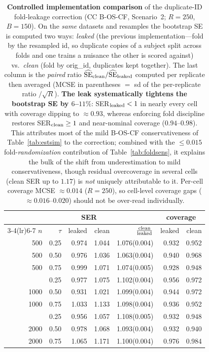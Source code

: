 \begin{table}[t]\centering\small
\caption{\textbf{Controlled implementation comparison} of the duplicate-ID fold-leakage correction (CC B-OS-CF, Scenario~2; $R=250$, $B=150$). On the \emph{same} datasets and resamples the bootstrap SE is computed two ways: \emph{leaked} (the previous implementation---fold by the resampled id, so duplicate copies of a subject split across folds and one trains a nuisance the other is scored against) vs.\ \emph{clean} (fold by orig\_id, duplicates kept together). The last column is the \emph{paired} ratio $\widehat{\mathrm{SE}}_{\rm clean}/\widehat{\mathrm{SE}}_{\rm leaked}$ computed per replicate then averaged (MCSE in parentheses $=$ sd of the per-replicate ratio $/\sqrt R$). \textbf{The leak systematically tightens the bootstrap SE by $6$--$11\%$}: SER$_{\rm leaked}<1$ in nearly every cell with coverage dipping to $\approx0.93$, whereas enforcing fold discipline restores SER$_{\rm clean}\ge1$ and near-nominal coverage ($0.94$--$0.98$). This attributes most of the mild B-OS-CF conservativeness of Table~\ref{tab:estsim} to the correction; combined with the $\le0.015$ fold-\emph{randomization} contribution of Table~\ref{tab:foldsens}, it explains the bulk of the shift from underestimation to mild conservativeness, though residual overcoverage in several cells (clean SER up to $1.17$) is \emph{not} uniquely attributable to it. Per-cell coverage MCSE $\approx0.014$ ($R{=}250$), so cell-level coverage gaps ($\approx0.016$--$0.020$) should not be over-read individually.}
\label{tab:leakfold}\begin{tabular}{rr rr r rr}\toprule
&&\multicolumn{2}{c}{SER}&&\multicolumn{2}{c}{coverage}\\
\cmidrule(lr){3-4}\cmidrule(lr){6-7}
$n$&$\tau$&leaked&clean&$\tfrac{\rm clean}{\rm leaked}$&leaked&clean\\\midrule
500 & 0.25 & 0.974 & 1.044 & 1.076(0.004) & 0.932 & 0.952 \\
500 & 0.50 & 0.976 & 1.036 & 1.063(0.004) & 0.940 & 0.968 \\
500 & 0.75 & 0.999 & 1.071 & 1.074(0.005) & 0.928 & 0.948 \\
\addlinespace
1000 & 0.25 & 0.977 & 1.075 & 1.102(0.004) & 0.956 & 0.972 \\
1000 & 0.50 & 0.931 & 1.021 & 1.099(0.004) & 0.944 & 0.972 \\
1000 & 0.75 & 1.033 & 1.133 & 1.098(0.004) & 0.936 & 0.952 \\
\addlinespace
2000 & 0.25 & 0.956 & 1.057 & 1.108(0.005) & 0.932 & 0.948 \\
2000 & 0.50 & 0.978 & 1.068 & 1.093(0.004) & 0.932 & 0.940 \\
2000 & 0.75 & 1.065 & 1.171 & 1.100(0.004) & 0.976 & 0.984 \\
\bottomrule\end{tabular}\end{table}
